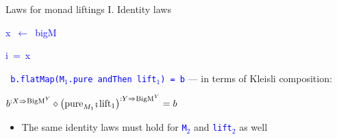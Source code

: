 \documentclass[english]{beamer}
\newenvironment{lyxcode}
  {\par\begin{list}{}{
    \setlength{\rightmargin}{\leftmargin}
    \setlength{\listparindent}{0pt}%
    \raggedright
    \setlength{\itemsep}{0pt}
    \setlength{\parsep}{0pt}
    \normalfont\ttfamily}%
   \def\{{\char`\{}
   \def\}{\char`\}}
   \def\textasciitilde{\char`\~}
   \item[]}
  {\end{list}}
\newcommand{\bef}{\hspace{0.5pt}\ensuremath\mathsmaller{\fatsemi}\hspace{1.5pt}}
\begin{document}
\begin{frame}{Laws for monad liftings I. Identity laws}
\begin{minipage}[t]{0.54\columnwidth}
\begin{lyxcode}
\textcolor{blue}{\footnotesize{}x~$\leftarrow$~bigM}{\footnotesize\par}

\textcolor{blue}{\footnotesize{}i~=~x}{\footnotesize\par}
\end{lyxcode}
%
\end{minipage}\texttt{\textcolor{blue}{\footnotesize{}\medskip{}
b.flatMap(M$_{1}$.pure andThen lift$_{1}$) = b}} --- in terms of
Kleisli composition:
\begin{center}
{\footnotesize{}\vspace{-0.1cm}\hspace{-0.0cm}$b^{:X\Rightarrow\text{BigM}^{Y}}\diamond\left(\text{pure}_{M_{1}}\bef\text{lift}_{1}\right)^{:Y\Rightarrow\text{BigM}^{Y}}=b$}{\footnotesize\par}
\par\end{center}
\begin{itemize}
\item {\footnotesize{}\vspace{-0.15cm}\hspace{-0.0cm}}The same identity
laws must hold for \texttt{\textcolor{blue}{\footnotesize{}M$_{2}$}}
and \texttt{\textcolor{blue}{\footnotesize{}lift$_{2}$}} as well
\end{itemize}
\end{frame}
\end{document}
